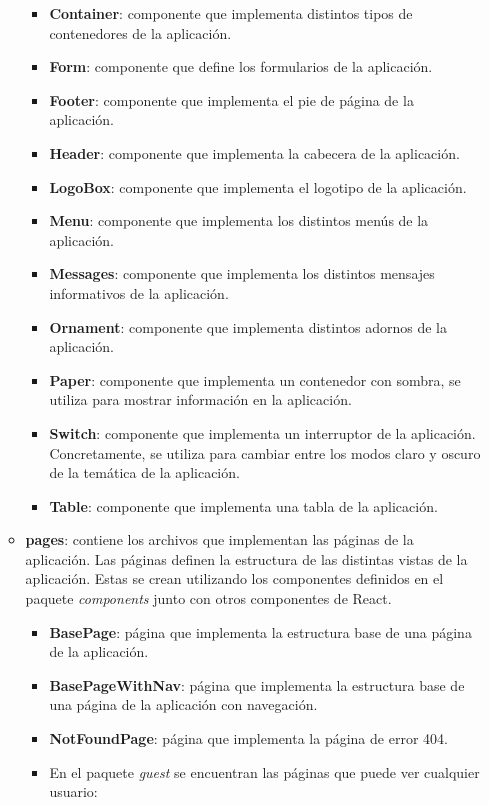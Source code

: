 \begin{itemize}
\begin{itemize}
\begin{itemize}
            \item \textbf{Container}: componente que implementa distintos tipos de contenedores de la aplicación.
            \item \textbf{Form}: componente que define los formularios de la aplicación.
            \item \textbf{Footer}: componente que implementa el pie de página de la aplicación.
            \item \textbf{Header}: componente que implementa la cabecera de la aplicación.
            \item \textbf{LogoBox}: componente que implementa el logotipo de la aplicación.
            \item \textbf{Menu}: componente que implementa los distintos menús de la aplicación.
            \item \textbf{Messages}: componente que implementa los distintos mensajes informativos de la aplicación.
            \item \textbf{Ornament}: componente que implementa distintos adornos de la aplicación.
            \item \textbf{Paper}: componente que implementa un contenedor con sombra, se utiliza para mostrar información en la aplicación.
            \item \textbf{Switch}: componente que implementa un interruptor de la aplicación. Concretamente, se utiliza para cambiar entre los modos claro y oscuro de la temática de la aplicación.
            \item \textbf{Table}: componente que implementa una tabla de la aplicación.
        \end{itemize}
        \item \textbf{pages}: contiene los archivos que implementan las páginas de la aplicación. Las páginas definen la estructura de las distintas vistas de la aplicación.
        Estas se crean utilizando los componentes definidos en el paquete \textit{components} junto con otros componentes de React.
        \begin{itemize}
            \item \textbf{BasePage}: página que implementa la estructura base de una página de la aplicación.
            \item \textbf{BasePageWithNav}: página que implementa la estructura base de una página de la aplicación con navegación.
            \item \textbf{NotFoundPage}: página que implementa la página de error 404.
            \item En el paquete \textit{guest} se encuentran las páginas que puede ver cualquier usuario:

\end{itemize}
\end{itemize}
\end{itemize}
